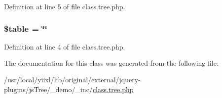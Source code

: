 Definition at line 5 of file class.tree.php.

\hypertarget{class__tree__struct_ae8876a14058f368335baccf35af4a22b}{
\subsubsection[{\$table}]{\setlength{\rightskip}{0pt plus 5cm}\$table = \char`\"{}\char`\"{}}}
\label{class__tree__struct_ae8876a14058f368335baccf35af4a22b}


Definition at line 4 of file class.tree.php.



The documentation for this class was generated from the following file:\begin{DoxyCompactItemize}
\item 
/usr/local/yiixl/lib/original/external/jquery-\/plugins/jsTree/\_\-demo/\_\-inc/\hyperlink{class_8tree_8php}{class.tree.php}\end{DoxyCompactItemize}
